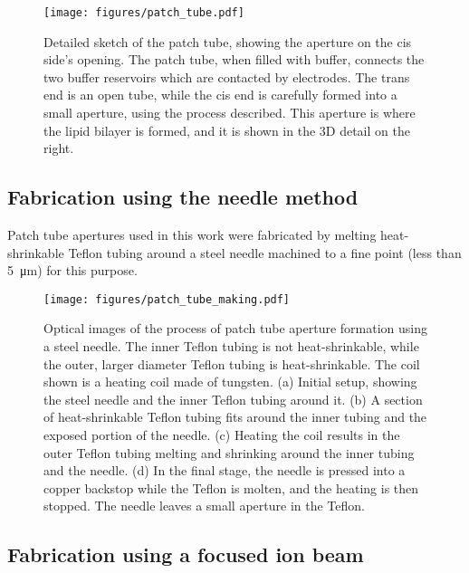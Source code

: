 \begin{figure}[h]
\begin{centering}
\texttt{[image: figures/patch\_tube.pdf]}
\caption[Schematic of patch tube]{Detailed sketch of the patch tube, showing the aperture on the cis side's opening.  The patch tube, when filled with buffer, connects the two buffer reservoirs which are contacted by electrodes.  The trans end is an open tube, while the cis end is carefully formed into a small aperture, using the process described.  This aperture is where the lipid bilayer is formed, and it is shown in the 3D detail on the right.}
\label{fig:patch_tube}
\end{centering}
\end{figure}

\subsection{Fabrication using the needle method}

Patch tube apertures used in this work were fabricated by melting heat-shrinkable Teflon tubing around a steel needle machined to a fine point (less than \SI{5}{\um}) for this purpose.

\begin{figure}[h]
\begin{centering}
\texttt{[image: figures/patch\_tube\_making.pdf]}
\caption[Patch tube aperture made using a steel needle]{Optical images of the process of patch tube aperture formation using a steel needle.  The inner Teflon tubing is not heat-shrinkable, while the outer, larger diameter Teflon tubing is heat-shrinkable.  The coil shown is a heating coil made of tungsten.  (a) Initial setup, showing the steel needle and the inner Teflon tubing around it.  (b) A section of heat-shrinkable Teflon tubing fits around the inner tubing and the exposed portion of the needle.  (c) Heating the coil results in the outer Teflon tubing melting and shrinking around the inner tubing and the needle.  (d) In the final stage, the needle is pressed into a copper backstop while the Teflon is molten, and the heating is then stopped.  The needle leaves a small aperture in the Teflon.}
\label{fig:patch_tube_needle}
\end{centering}
\end{figure}

\subsection{Fabrication using a focused ion beam}

